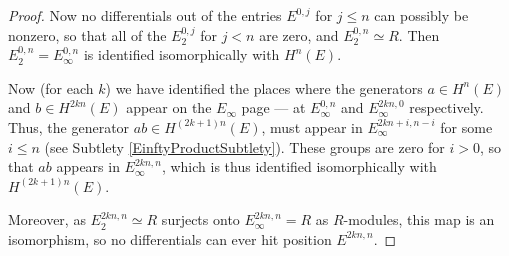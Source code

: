 \begin{proof}
Now no differentials out of the entries $E^{0,j}$ for $j\leq n$ can possibly be nonzero, so that all of the $E_2^{0,j}$ for $j<n$ are zero, and $E_2^{0,n}\simeq R$. Then $E_2^{0,n}=E_\infty^{0,n}$ is identified isomorphically with $H^n(E)$.

Now (for each $k$) we have identified the places where the generators $a\in H^n(E)$ and $b\in H^{2kn}(E)$ appear on the $E_{\infty}$ page --- at $E_\infty^{0,n}$ and $E_\infty^{2kn,0}$ respectively. Thus, the generator $ab\in H^{(2k+1)n}(E)$, must appear in $E_{\infty}^{2kn+i,n-i}$ for some $i\leq n$ (see Subtlety \ref{EinftyProductSubtlety}).
These groups are zero for $i>0$, so that $ab$ appears in $E_{\infty}^{2kn,n}$, which is thus identified isomorphically with $H^{(2k+1)n}(E)$.

Moreover, as $E_2^{2kn,n}\simeq R$ surjects onto $E_\infty^{2kn,n}=R$ as $R$-modules, this map is an isomorphism, so no differentials can ever hit position $E^{2kn,n}$.

%


\end{proof}
